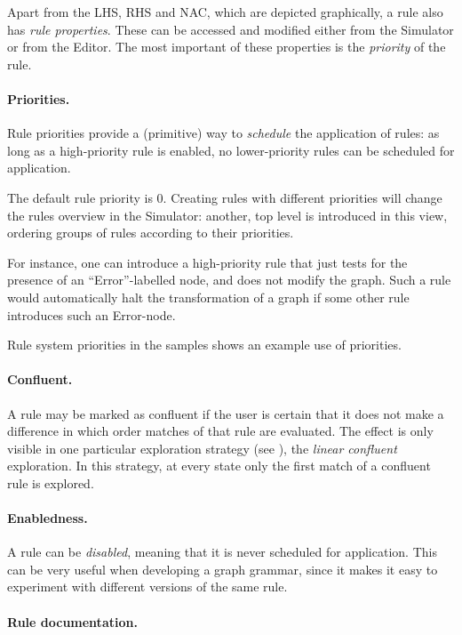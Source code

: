 Apart from the LHS, RHS and NAC, which are depicted graphically, a rule also
has \emph{rule properties}. These can be accessed and modified either from the
Simulator or from the Editor. The most important of these properties is the
\emph{priority} of the rule. 

\paragraph{Priorities.}

Rule priorities provide a (primitive) way to
\emph{schedule} the application of rules: as long as a high-priority rule is
enabled, no lower-priority rules can be scheduled for application.

The default rule priority is 0. Creating rules with different priorities will
change the rules overview in the Simulator: another, top level is introduced in
this view, ordering groups of rules according to their priorities.

For instance, one can introduce a high-priority rule that just tests for the
presence of an ``\textsf{Error}''-labelled node, and does not modify the
graph. Such a rule would automatically halt the transformation of a graph if
some other rule introduces such an \textsf{Error}-node.

Rule system \textsf{priorities} in the \Groove{} samples shows an example use
of priorities.

\paragraph{Confluent.}

A rule may be marked as confluent if the user is certain that it does not
make a difference in which order matches of that rule are evaluated. The effect
is only visible in one particular exploration strategy (see ),
the \emph{linear confluent} exploration. In this strategy, at every state only
the first match of a confluent rule is explored.

\paragraph{Enabledness.}

A rule can be \emph{disabled}, meaning that it is never scheduled for
application. This can be very useful when developing a graph grammar, since it
makes it easy to experiment with different versions of the same rule.

\paragraph{Rule documentation.}

